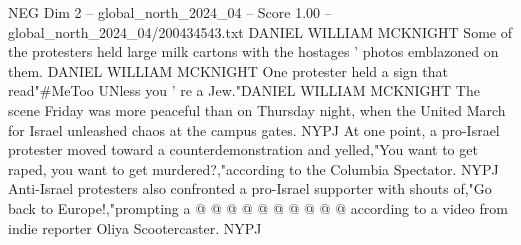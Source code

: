 \begin{textsample}{NEG Dim 2 – global\_north\_2024\_04 – Score 1.00 – global\_north\_2024\_04/200434543.txt}
DANIEL WILLIAM MCKNIGHT Some of the protesters held large milk cartons with the hostages ' photos emblazoned on them.
DANIEL WILLIAM MCKNIGHT One protester held a sign that read"\#MeToo UNless you ' re a Jew."DANIEL WILLIAM MCKNIGHT The scene Friday was more peaceful than on Thursday night, when the United March for Israel unleashed chaos at the campus gates.
NYPJ At one point, a pro-Israel protester moved toward a counterdemonstration and yelled,"You want to get raped, you want to get murdered?,"according to the Columbia Spectator.
NYPJ Anti-Israel protesters also confronted a pro-Israel supporter with shouts of,"Go back to Europe!,"prompting a @ @ @ @ @ @ @ @ @ @ according to a video from indie reporter Oliya Scootercaster.
NYPJ

\end{textsample}
